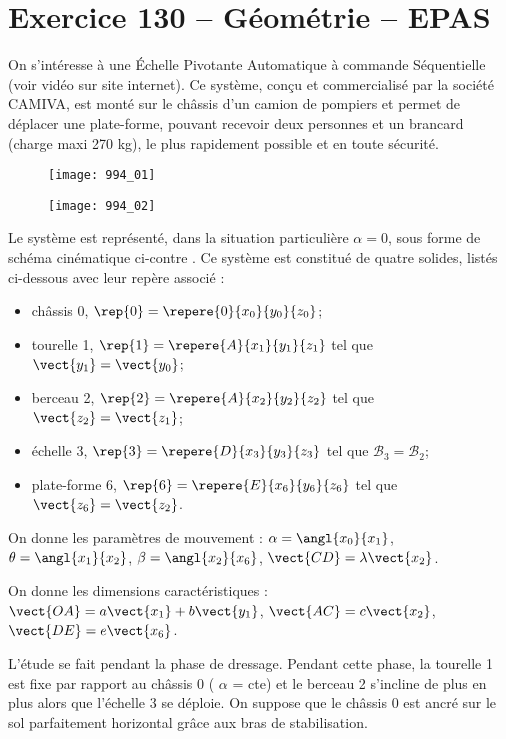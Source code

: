 \section*{Exercice 130 -- Géométrie -- EPAS}
\setcounter{exo}{0}


On s’intéresse à une Échelle Pivotante Automatique à commande Séquentielle (voir vidéo sur site internet).
Ce système, conçu et commercialisé par la société CAMIVA, est monté sur le châssis d’un camion de pompiers et permet de
déplacer une plate-forme, pouvant recevoir deux personnes et un brancard (charge maxi 270 kg), le plus rapidement
possible et en toute sécurité.

\begin{figure}[H]
\centering
\texttt{[image: 994\_01]}
\end{figure}

\begin{figure}[H]
\centering
\texttt{[image: 994\_02]}
\end{figure}



Le système est représenté, dans la situation particulière $\alpha= 0$, sous forme de schéma cinématique ci-contre .
Ce système est constitué de quatre solides, listés ci-dessous avec leur repère associé :
\begin{itemize}
\item châssis 0, $\rep{0}=\repere{0}{x_0}{y_0}{z_0}$;
\item tourelle 1, $\rep{1}=\repere{A}{x_1}{y_1}{z_1}$ tel que $\vect{y_1}=\vect{y_0}$;
\item berceau 2, $\rep{2}=\repere{A}{x_2}{y_2}{z_2}$ tel que $\vect{z_2}=\vect{z_1}$;
\item échelle 3, $\rep{3}=\repere{D}{x_3}{y_3}{z_3}$ tel que $\mathcal{B}_3=\mathcal{B}_2$;
\item plate-forme 6, $\rep{6}=\repere{E}{x_6}{y_6}{z_6}$ tel que $\vect{z_6}=\vect{z_2}$.
\end{itemize}

On donne les paramètres de mouvement :
$\alpha = \angl{x_0}{x_1}$, $\theta= \angl{x_1}{x_2}$, $\beta = \angl{x_2}{x_6}$, $\vect{CD}= \lambda \vect{x_2}$.

On donne les dimensions caractéristiques : $\vect{OA}=a\vect{x_1} + b\vect{y_1}$, $\vect{AC} = c\vect{x_2}$, $\vect{DE}=e\vect{x_6}$.

L’étude se fait pendant la phase de dressage. Pendant cette phase, la tourelle 1 est fixe par rapport au châssis 0 ( $\alpha$ = cte) et le berceau 2 s’incline de plus en plus alors que l’échelle 3 se déploie. On suppose que le châssis 0 est ancré sur le sol
parfaitement horizontal grâce aux bras de stabilisation.

